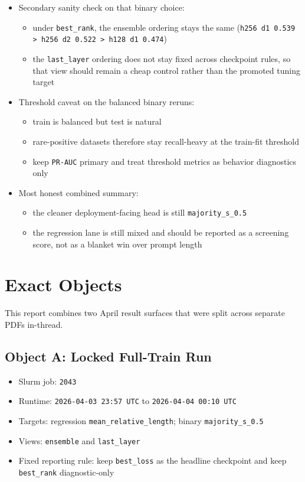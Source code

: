 \documentclass[11pt]{article}
\begin{document}
\begin{itemize}[leftmargin=1.5em]
\begin{itemize}[leftmargin=1.5em]
  \item if one single global binary ensemble surface is needed today, it should be \texttt{h256 d1}, not \texttt{h256 d2}
  \end{itemize}
\item Secondary sanity check on that binary choice:
  \begin{itemize}[leftmargin=1.5em]
  \item under \texttt{best\_rank}, the ensemble ordering stays the same (\texttt{h256 d1 0.539 > h256 d2 0.522 > h128 d1 0.474})
  \item the \texttt{last\_layer} ordering does not stay fixed across checkpoint rules, so that view should remain a cheap control rather than the promoted tuning target
  \end{itemize}
\item Threshold caveat on the balanced binary reruns:
  \begin{itemize}[leftmargin=1.5em]
  \item train is balanced but test is natural
  \item rare-positive datasets therefore stay recall-heavy at the train-fit threshold
  \item keep \texttt{PR-AUC} primary and treat threshold metrics as behavior diagnostics only
  \end{itemize}
\item Most honest combined summary:
  \begin{itemize}[leftmargin=1.5em]
  \item the cleaner deployment-facing head is still \texttt{majority\_s\_0.5}
  \item the regression lane is still mixed and should be reported as a screening score, not as a blanket win over prompt length
  \end{itemize}
\end{itemize}

\section*{Exact Objects}
This report combines two April result surfaces that were split across separate PDFs in-thread.

\subsection*{Object A: Locked Full-Train Run}
\begin{itemize}[leftmargin=1.5em]
\item Slurm job: \texttt{2043}
\item Runtime: \texttt{2026-04-03 23:57 UTC} to \texttt{2026-04-04 00:10 UTC}
\item Targets: regression \texttt{mean\_relative\_length}; binary \texttt{majority\_s\_0.5}
\item Views: \texttt{ensemble} and \texttt{last\_layer}
\item Fixed reporting rule: keep \texttt{best\_loss} as the headline checkpoint and keep \texttt{best\_rank} diagnostic-only
\end{itemize}
\end{document}
